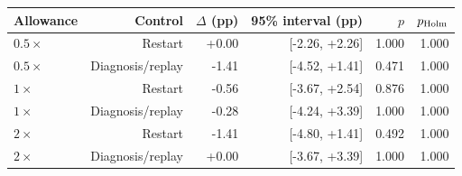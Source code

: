 \begin{tabular}{@{}lrrrrr@{}}
\toprule
Allowance & Control & $\Delta$ (pp) & 95\% interval (pp) & $p$ & $p_{\rm Holm}$ \\
\midrule
$0.5\times$ & Restart & +0.00 & [-2.26, +2.26] & 1.000 & 1.000 \\
$0.5\times$ & Diagnosis/replay & -1.41 & [-4.52, +1.41] & 0.471 & 1.000 \\
$1\times$ & Restart & -0.56 & [-3.67, +2.54] & 0.876 & 1.000 \\
$1\times$ & Diagnosis/replay & -0.28 & [-4.24, +3.39] & 1.000 & 1.000 \\
$2\times$ & Restart & -1.41 & [-4.80, +1.41] & 0.492 & 1.000 \\
$2\times$ & Diagnosis/replay & +0.00 & [-3.67, +3.39] & 1.000 & 1.000 \\
\bottomrule
\end{tabular}
